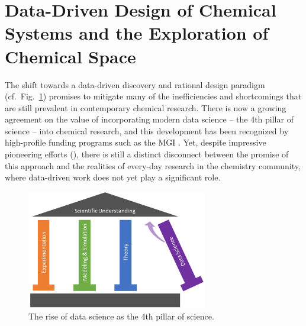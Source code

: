 \section{Data-Driven Design of Chemical Systems and the Exploration of Chemical Space}

The shift towards a data-driven discovery and rational design paradigm (cf.\ Fig.\ \ref{fig:4th_pillar}) promises to mitigate many of the inefficiencies and shortcomings that are still prevalent in contemporary chemical research. 
There is now a growing agreement on the value of incorporating modern data science -- the 4th pillar of science -- into chemical research, and this development has been recognized by high-profile funding programs such as the MGI \cite{NationalMaterials2011}.
Yet, despite impressive pioneering efforts (\eg  \cite{Hansen2013a,Huan2015,PhysRevB.87.219902,doi:10.1021/cm503507h,Behler2007}), 
there is still a distinct disconnect between the promise of this approach and the realities of every-day research in the chemistry community, where data-driven work does not yet play a significant role. 

\begin{figure}[htbp]
	\centering
	\includegraphics[width=0.7\textwidth]{Chapter-1/Figures/4th_pillar.png}
	\caption{The rise of data science as the 4th pillar of science.}
	\label{fig:4th_pillar}
\end{figure}

